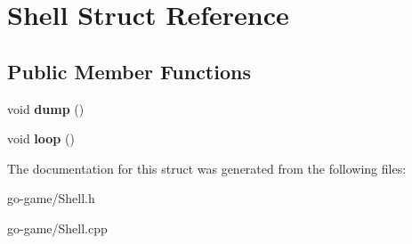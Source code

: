 \hypertarget{struct_shell}{}\section{Shell Struct Reference}
\label{struct_shell}
\subsection*{Public Member Functions}
\begin{DoxyCompactItemize}
\item 
\mbox{\label{struct_shell_a0a619b33d30ae0036e3783466d496fbf}} 
void {\bfseries dump} ()
\item 
\mbox{\label{struct_shell_afc45cae4ccfc76321a254bb617dce08c}} 
void {\bfseries loop} ()
\end{DoxyCompactItemize}


The documentation for this struct was generated from the following files\+:\begin{DoxyCompactItemize}
\item 
go-\/game/Shell.\+h\item 
go-\/game/Shell.\+cpp\end{DoxyCompactItemize}
